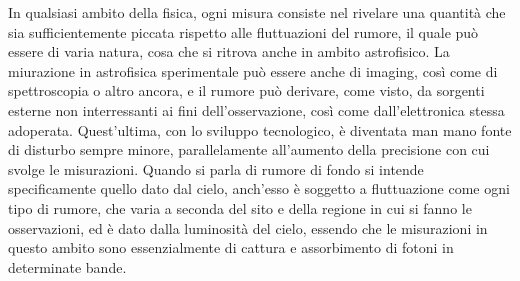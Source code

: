 In qualsiasi ambito della fisica, ogni misura consiste nel rivelare una quantità che sia sufficientemente piccata rispetto alle fluttuazioni del rumore, il quale può essere di varia natura, cosa che si ritrova anche in ambito astrofisico. La miurazione in astrofisica sperimentale può essere anche di imaging, così come di spettroscopia o altro ancora, e il rumore può derivare, come visto, da sorgenti esterne non interressanti ai fini dell'osservazione, così come dall'elettronica stessa adoperata. Quest'ultima, con lo sviluppo tecnologico, è diventata man mano fonte di disturbo sempre minore, parallelamente all'aumento della precisione con cui svolge le misurazioni. Quando si parla di rumore di fondo si intende specificamente quello dato dal cielo, anch'esso è soggetto a fluttuazione come ogni tipo di rumore, che varia a seconda del sito e della regione in cui si fanno le osservazioni, ed è dato dalla luminosità del cielo, essendo che le misurazioni in questo ambito sono essenzialmente di cattura e assorbimento di fotoni in determinate bande.

